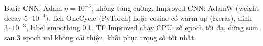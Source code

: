 Basic CNN: Adam $\eta=10^{-3}$, không tăng cường. Improved CNN: AdamW (weight decay $5\cdot10^{-4}$), lịch OneCycle (PyTorch) hoặc cosine có warm-up (Keras), đỉnh $3\cdot10^{-3}$, label smoothing 0,1. TF Improved chạy CPU: số epoch tối đa, dừng sớm sau 3 epoch val không cải thiện, khôi phục trọng số tốt nhất.

